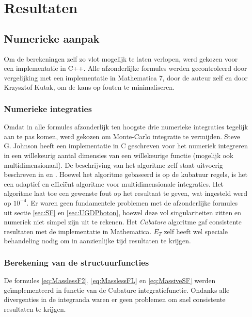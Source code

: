 \documentclass[a4paper,11pt]{article}
\numberwithin{equation}{section} %
\begin{document}
\section{Resultaten}
  \subsection{Numerieke aanpak}
Om de berekeningen zelf zo vlot mogelijk te laten verlopen, werd gekozen voor een implementatie in C++.
Alle afzonderlijke formules werden gecontroleerd door vergelijking met een implementatie in Mathematica 7, door de auteur zelf en door Krzysztof Kutak, om de kans op fouten te minimaliseren.

  \subsubsection{Numerieke integraties}
Omdat in alle formules afzonderlijk ten hoogste drie numerieke integraties tegelijk aan te pas komen, werd gekozen om Monte-Carlo integratie te vermijden.
Steve G. Johnson heeft een implementatie in C geschreven voor het numeriek integreren in een willekeurig aantal dimensies van een willekeurige functie (mogelijk ook multidimensionaal).
De beschrijving van het algoritme zelf staat uitvoerig beschreven in \cite{Genz} en \cite{Berntsen}.
Hoewel het algoritme gebaseerd is op de kubatuur regels, is het een adaptief en efficiënt algoritme voor multidimensionale integraties.
Het algoritme laat toe een gewenste fout op het resultaat te geven, wat ingesteld werd op $10^{-4}$.
Er waren geen fundamentele problemen met de afzonderlijke formules uit sectie \ref{sec:SF} en \ref{sec:UGDPhoton}, hoewel deze vol singulariteiten zitten en numeriek niet simpel zijn uit te rekenen.
Het \textit{Cubature} algoritme gaf consistente resultaten met de implementatie in Mathematica.
$E_T$ zelf heeft wel speciale behandeling nodig om in aanzienlijke tijd resultaten te krijgen.

    \subsubsection{Berekening van de structuurfuncties}
De formules \eqref{eq:MasslessF2}, \eqref{eq:MasslessFL} en \eqref{eq:MassiveSF} werden geïmplementeerd in functie van de Cubature integratiefunctie.
Ondanks alle divergenties in de integranda waren er geen problemen om snel consistente resultaten te krijgen.
\end{document}
